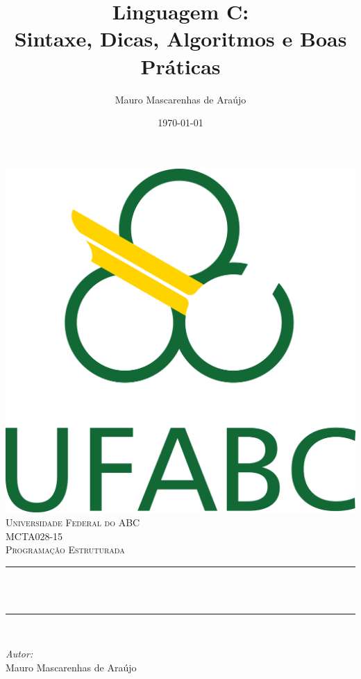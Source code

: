 \documentclass[12pt]{article}
\title{Linguagem C:\\
        Sintaxe, Dicas, Algoritmos e Boas Práticas}			%
\author{Mauro Mascarenhas de Araújo}			%
\date{\today}											%
\makeatletter
\let\thetitle\@title
\let\thedate\@date
\makeatother
\begin{document}

\begin{titlepage}
	\centering
    \vspace*{0.4 cm}
    \includegraphics[scale = 1.5]{ufabc-logo.png}\\[1.0 cm]
    \textsc{\LARGE Universidade Federal do ABC}\\[2.0 cm]	%
	\textsc{\Large MCTA028-15}\\[0.5 cm]				%
	\textsc{\large Programação Estruturada}\\[0.5 cm]				%
	\rule{\linewidth}{0.3 mm} \\[0.4 cm]
	\huge{\bfseries \thetitle}\\
	\rule{\linewidth}{0.2 mm} \\[1.5 cm]
	
	\begin{minipage}{0.5\textwidth}
		\begin{flushleft} \large
			\emph{Autor:}\\Mauro Mascarenhas de Araújo
			\end{flushleft}
			\end{minipage}~
			\begin{minipage}{0.4\textwidth}
			\begin{flushright} \large
		\end{flushright}
	\end{minipage}%

	\vfill
	{\large \thedate}
 
\end{titlepage}
\end{document}

